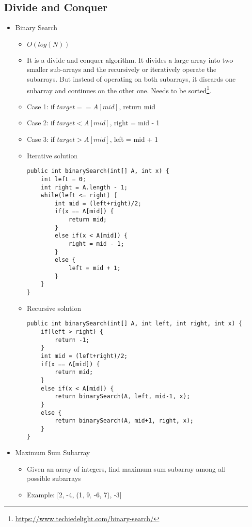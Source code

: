 \documentclass[a4paper, 11.25pt]{article}
\begin{document}
\subsection{Divide and Conquer}
\label{sec:divideAndConquer}
\begin{itemize}
    \item Binary Search
    \begin{itemize}
    \item $O(log(N))$
        \item It is a divide and conquer algorithm. It divides a large array into two smaller sub-arrays and the recursively or iteratively operate the subarrays. But instead of operating on both subarrays, it discards one subarray and continues on the other one. Needs to be sorted\footnote{\url{https://www.techiedelight.com/binary-search/}}.
        \item Case 1: if $target == A[mid]$, return mid
        \item Case 2: if $target < A[mid]$, right = mid - 1
        \item Case 3: if $target > A[mid]$, left = mid + 1
        \item Iterative solution
        \begin{lstlisting}[style=CStyle]
public int binarySearch(int[] A, int x) {
    int left = 0;
    int right = A.length - 1;
    while(left <= right) {
        int mid = (left+right)/2;
        if(x == A[mid]) {
            return mid;
        }
        else if(x < A[mid]) {
            right = mid - 1;
        }
        else {
            left = mid + 1;
        }
    }
}\end{lstlisting}
        \item Recursive solution
        \begin{lstlisting}[style=CStyle]
public int binarySearch(int[] A, int left, int right, int x) {
    if(left > right) {
        return -1;
    }
    int mid = (left+right)/2;
    if(x == A[mid]) {
        return mid;
    }
    else if(x < A[mid]) {
        return binarySearch(A, left, mid-1, x);
    }
    else {
        return binarySearch(A, mid+1, right, x);
    }
}\end{lstlisting} 
    \end{itemize}
    \item Maximum Sum Subarray
    \begin{itemize}
        \item Given an array of integers, find maximum sum subarray among all possible subarrays
        \item Example: [2, -4, (1, 9, -6, 7), -3]

\end{itemize}
\end{itemize}
\end{document}
